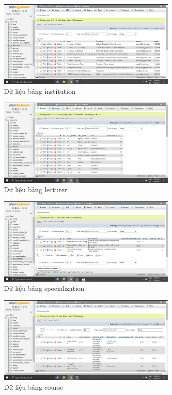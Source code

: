 \documentclass[12pt,a4paper,titlepage]{article}
\begin{document}
\begin{figure}[h!]
	\centering
	\caption{Dữ liệu bảng institution}
	\includegraphics[width=0.8\textwidth]{images/dat8.png}
\end{figure}
\newpage
\begin{figure}[h!]
	\centering
	\caption{Dữ liệu bảng lecturer}
	\includegraphics[width=0.8\textwidth]{images/dat9.png}
\end{figure}
\begin{figure}[h!]
	\centering
	\caption{Dữ liệu bảng specialization}
	\includegraphics[width=0.8\textwidth]{images/dat14.png}
\end{figure}
\begin{figure}[h!]
	\centering
	\caption{Dữ liệu bảng course}
	\includegraphics[width=0.8\textwidth]{images/dat2.png}
\end{figure}
\end{document}
